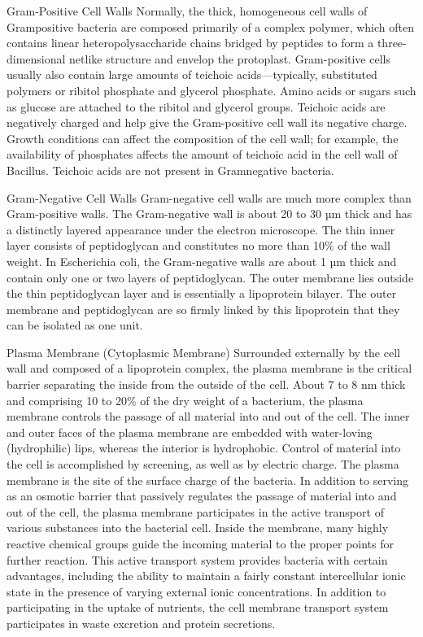 \documentclass{article}
\begin{document}
Gram-Positive Cell Walls Normally, the thick, homogeneous cell walls of
Grampositive bacteria are composed primarily of a complex polymer, which
often contains linear heteropolysaccharide chains bridged by peptides to
form a three-dimensional netlike structure and envelop the protoplast.
Gram-positive cells usually also contain large amounts of teichoic
acids---typically, substituted polymers or ribitol phosphate and
glycerol phosphate. Amino acids or sugars such as glucose are attached
to the ribitol and glycerol groups. Teichoic acids are negatively
charged and help give the Gram-positive cell wall its negative charge.
Growth conditions can affect the composition of the cell wall; for
example, the availability of phosphates affects the amount of teichoic
acid in the cell wall of Bacillus. Teichoic acids are not present in
Gramnegative bacteria.

Gram-Negative Cell Walls Gram-negative cell walls are much more complex
than Gram-positive walls. The Gram-negative wall is about 20 to 30 µm
thick and has a distinctly layered appearance under the electron
microscope. The thin inner layer consists of peptidoglycan and
constitutes no more than 10\% of the wall weight. In Escherichia coli,
the Gram-negative walls are about 1 µm thick and contain only one or two
layers of peptidoglycan. The outer membrane lies outside the thin
peptidoglycan layer and is essentially a lipoprotein bilayer. The outer
membrane and peptidoglycan are so firmly linked by this lipoprotein that
they can be isolated as one unit.

Plasma Membrane (Cytoplasmic Membrane) Surrounded externally by the cell
wall and composed of a lipoprotein complex, the plasma membrane is the
critical barrier separating the inside from the outside of the cell.
About 7 to 8 nm thick and comprising 10 to 20\% of the dry weight of a
bacterium, the plasma membrane controls the passage of all material into
and out of the cell. The inner and outer faces of the plasma membrane
are embedded with water-loving (hydrophilic) lips, whereas the interior
is hydrophobic. Control of material into the cell is accomplished by
screening, as well as by electric charge. The plasma membrane is the
site of the surface charge of the bacteria. In addition to serving as an
osmotic barrier that passively regulates the passage of material into
and out of the cell, the plasma membrane participates in the active
transport of various substances into the bacterial cell. Inside the
membrane, many highly reactive chemical groups guide the incoming
material to the proper points for further reaction. This active
transport system provides bacteria with certain advantages, including
the ability to maintain a fairly constant intercellular ionic state in
the presence of varying external ionic concentrations. In addition to
participating in the uptake of nutrients, the cell membrane transport
system participates in waste excretion and protein secretions.
\end{document}
